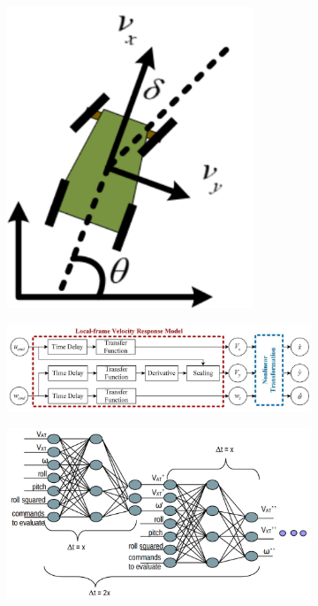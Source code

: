 \documentclass[../thesis.tex]{subfiles}
\begin{document}
\begin{figure}[t]
	\centering
	\begin{subfigure}[b]{0.18\linewidth}
		\includegraphics[width=\columnwidth]{./RRTPlanner/fig/vehicle_frame.png}
		\subcaption{}
		\label{fig:vehicle_model_frame}
	\end{subfigure}
	\begin{subfigure}[b]{0.8\linewidth}
		\includegraphics[width=\columnwidth]{./RRTPlanner/fig/vehicle_model_block.png}
		\subcaption{}
		\label{fig:vehicle_model_block}
	\end{subfigure}
	\begin{subfigure}[b]{0.8\linewidth}
		\includegraphics[width=\columnwidth]{./RRTPlanner/fig/neuralnet_model.png}

\end{subfigure}
\end{figure}
\end{document}
